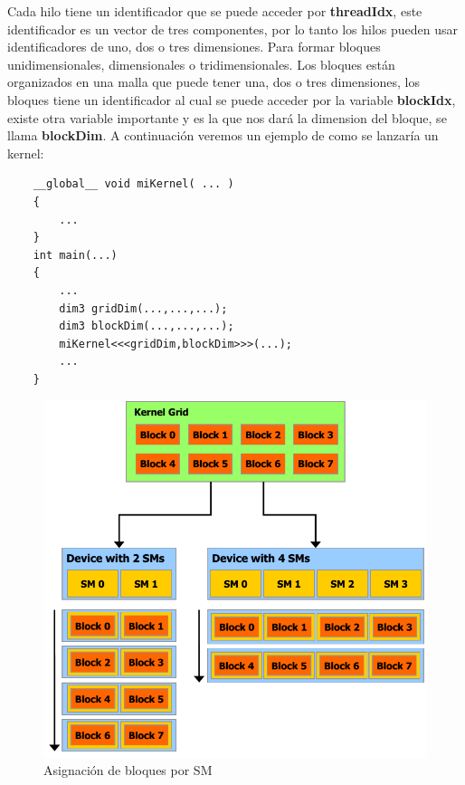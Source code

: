Cada hilo tiene un identificador que se puede acceder por \textbf{threadIdx}, este identificador es un vector de tres componentes, por lo tanto los hilos pueden usar identificadores de uno, dos o tres dimensiones. Para formar bloques unidimensionales, dimensionales o tridimensionales. Los bloques están organizados en una malla que puede tener una, dos o tres dimensiones, los bloques tiene un identificador al cual se puede acceder por la variable \textbf{blockIdx}, existe otra variable importante y es la que nos dará la dimension del bloque, se llama \textbf{blockDim}. A continuación veremos un ejemplo de como se lanzaría un kernel:

\begin{lstlisting}
	__global__ void miKernel( ... )
    {
   		...
    }
	int main(...)
	{
		...	
		dim3 gridDim(...,...,...);
		dim3 blockDim(...,...,...);
		miKernel<<<gridDim,blockDim>>>(...);	
		...
	}
\end{lstlisting}

\begin{figure}[h]
			\centering
				\includegraphics[scale=0.4]{img/block_sm.png}
			\caption{Asignación de bloques por SM}
\end{figure}



